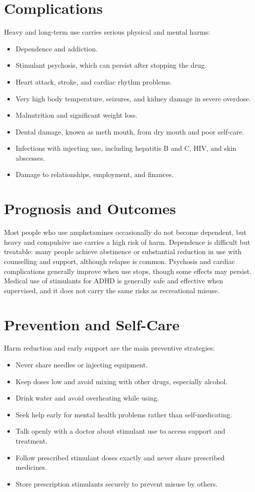\section*{Complications}
Heavy and long-term use carries serious physical and mental harms:

\begin{itemize}
    \item Dependence and addiction.
    \item Stimulant psychosis, which can persist after stopping the drug.
    \item Heart attack, stroke, and cardiac rhythm problems.
    \item Very high body temperature, seizures, and kidney damage in severe overdose.
    \item Malnutrition and significant weight loss.
    \item Dental damage, known as meth mouth, from dry mouth and poor self-care.
    \item Infections with injecting use, including hepatitis B and C, HIV, and skin abscesses.
    \item Damage to relationships, employment, and finances.
\end{itemize}

\section*{Prognosis and Outcomes}
Most people who use amphetamines occasionally do not become dependent, but heavy and compulsive use carries a high risk of harm. Dependence is difficult but treatable: many people achieve abstinence or substantial reduction in use with counselling and support, although relapse is common. Psychosis and cardiac complications generally improve when use stops, though some effects may persist. Medical use of stimulants for ADHD is generally safe and effective when supervised, and it does not carry the same risks as recreational misuse.

\section*{Prevention and Self-Care}
Harm reduction and early support are the main preventive strategies:

\begin{itemize}
    \item Never share needles or injecting equipment.
    \item Keep doses low and avoid mixing with other drugs, especially alcohol.
    \item Drink water and avoid overheating while using.
    \item Seek help early for mental health problems rather than self-medicating.
    \item Talk openly with a doctor about stimulant use to access support and treatment.
    \item Follow prescribed stimulant doses exactly and never share prescribed medicines.
    \item Store prescription stimulants securely to prevent misuse by others.
\end{itemize}

